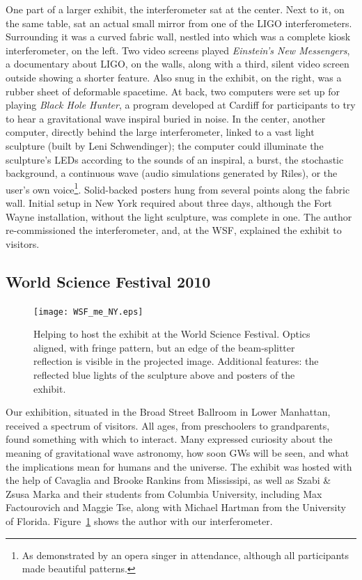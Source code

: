 One part of a larger exhibit, the interferometer sat at the center.
Next to it, on the same table, sat an actual small mirror from one of the LIGO interferometers.
Surrounding it was a curved fabric wall, nestled into which was a complete kiosk interferometer, on the left.
Two video screens played \textit{Einstein's New Messengers}, a documentary about LIGO, on the walls, along with a third, silent video screen outside showing a shorter feature.
Also snug in the exhibit, on the right, was a rubber sheet of deformable spacetime.
At back, two computers were set up for playing \textit{Black Hole Hunter}, a program developed at Cardiff for participants to try to hear a gravitational wave inspiral buried in noise.
In the center, another computer, directly behind the large interferometer, linked to a vast light sculpture (built by Leni Schwendinger); the computer could illuminate the sculpture's LEDs according to the sounds of an inspiral, a burst, the stochastic background, a continuous wave (audio simulations generated by Riles), or the user's own voice\footnote{As demonstrated by an opera singer in attendance, although all participants made beautiful patterns.}.
Solid-backed posters hung from several points along the fabric wall.
Initial setup in New York required about three days, although the Fort Wayne installation, without the light sculpture, was complete in one.
The author re-commissioned the interferometer, and, at the WSF, explained the exhibit to visitors.

        \subsection{World Science Festival 2010}
        \label{WSF2010}


	\begin{figure}
	\begin{center}
	\texttt{[image: WSF\_me\_NY.eps]}
	\caption{Helping to host the exhibit at the World Science Festival. Optics aligned, with fringe pattern, but an edge of the beam-splitter reflection is visible in the projected image. Additional features: the reflected blue lights of the sculpture above and posters of the exhibit.}
	\label{WSF_IFO_me}
	\end{center}
	\end{figure}

Our exhibition, situated in the Broad Street Ballroom in Lower Manhattan, received a spectrum of visitors.
All ages, from preschoolers to grandparents, found something with which to interact.
Many expressed curiosity about the meaning of gravitational wave astronomy, how soon GWs will be seen, and what the implications mean for humans and the universe.
The exhibit was hosted with the help of Cavaglia and Brooke Rankins from Mississipi, as well as Szabi \& Zsusa Marka and their students from Columbia University, including Max Factourovich and Maggie Tse, along with Michael Hartman from the University of Florida.
Figure~\ref{WSF_IFO_me} shows the author with our interferometer.

